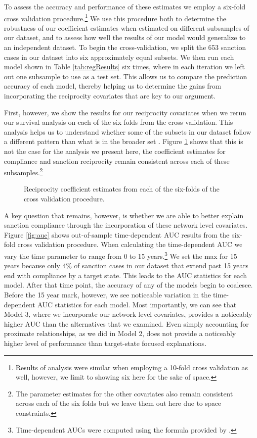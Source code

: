 To assess the accuracy and performance of these estimates we employ a six-fold cross validation procedure.\footnote{Results of analysis were similar when employing a 10-fold cross validation as well, however, we limit to showing six here for the sake of space.} We use this procedure both to determine the robustness of our coefficient estimates when estimated on different subsamples of our dataset, and to assess how well the results of our model would generalize to an independent dataset. To begin the cross-validation, we split the 653 sanction cases in our dataset into six approximately equal subsets. We then run each model shown in Table \ref{tab:regResults} six times, where in each iteration we left out one subsample to use as a test set. This allows us to compare the prediction accuracy of each model, thereby helping us to determine the gains from incorporating the reciprocity covariates that are key to our argument.

First, however, we show the results for our reciprocity covariates when we rerun our survival analysis on each of the six folds from the cross-validation. This analysis helps us to understand whether some of the subsets in our dataset follow a different pattern than what is in the broader set \citep{beck2008time}. Figure \ref{fig:crossval} shows that this is not the case for the analysis we present here, the coefficient estimates for compliance and sanction reciprocity remain consistent across each of these subsamples.\footnote{The parameter estimates for the other covariates also remain consistent across each of the six folds but we leave them out here due to space constraints.}

\begin{figure}[ht]
	\centering
	\caption{Reciprocity coefficient estimates from each of the six-folds of the cross validation procedure.}
	\resizebox{1\textwidth}{!}{}
	\label{fig:crossval}
\end{figure}
\FloatBarrier

A key question that remains, however, is whether we are able to better explain sanction compliance through the incorporation of these network level covariates. Figure \ref{fig:auc} shows out-of-sample time-dependent AUC results from the six-fold cross validation procedure. When calculating the time-dependent AUC we vary the time parameter to range from 0 to 15 years.\footnote{Time-dependent AUCs were computed using the formula provided by \citet{chambless2006estimation}.} We set the max for 15 years because only 4\% of sanction cases in our dataset that extend past 15 years end with compliance by a target state. This leads to the AUC statistics for each model. After that time point, the accuracy of any of the models begin to coalesce. Before the 15 year mark, however, we see noticeable variation in the time-dependent AUC statistics for each model. Most importantly, we can see that Model 3, where we incorporate our network level covariates, provides a noticeably higher AUC than the alternatives that we examined. Even simply accounting for proximate relationships, as we did in Model 2, does not provide a noticeably higher level of performance than target-state focused explanations.

